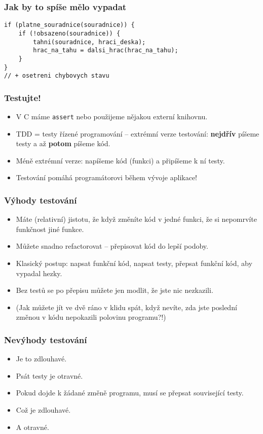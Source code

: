 \documentclass{beamer}
\newenvironment{itemizex}%
  {\large \begin{itemize}%
    \setlength{\itemsep}{8pt}%
    \setlength{\parskip}{8pt}}%
  {\end{itemize}}
\begin{document}
\begin{frame}[t,fragile]\frametitle{Jak by to spíše mělo vypadat} 
\begin{verbatim} 
if (platne_souradnice(souradnice)) {
    if (!obsazeno(souradnice)) {
        tahni(souradnice, hraci_deska);
        hrac_na_tahu = dalsi_hrac(hrac_na_tahu);
    } 
}
// + osetreni chybovych stavu
\end{verbatim}
\end{frame}


\begin{frame}[t,fragile]\frametitle{Testujte!} 
    \begin{itemizex}
        \item V C máme \texttt{assert} nebo použijeme nějakou externí knihovnu.
        \item TDD = testy řízené programování -- extrémní verze testování: \textbf{nejdřív} píšeme testy a až \textbf{potom} píšeme kód.
        \item Méně extrémní verze: napíšeme kód (funkci) a připíšeme k ní testy.
        \item Testování pomáhá programátorovi během vývoje aplikace! 
    \end{itemizex}
\end{frame}


\begin{frame}[t,fragile]\frametitle{Výhody testování} 
    \begin{itemizex}
        \item Máte (relativní) jistotu, že když změníte kód v jedné funkci, že si nepomrvíte funkčnost jiné funkce.
        \item Můžete snadno refactorovat -- přepisovat kód do lepší podoby. 
        \item Klasický postup: napsat funkční kód, napsat testy, přepsat funkční kód, aby vypadal hezky. 
        \item Bez testů se po přepisu můžete jen modlit, že jste nic nezkazili. 
        \item (Jak můžete jít ve dvě ráno v klidu spát, když nevíte, zda jste poslední změnou v kódu nepokazili polovinu programu?!)
    \end{itemizex}
\end{frame}


\begin{frame}[t,fragile]\frametitle{Nevýhody testování} 
    \begin{itemizex}
        \item Je to zdlouhavé. 
        \item Psát testy je otravné.
        \item Pokud dojde k žádané změně programu, musí se přepsat související testy.
        \item Což je zdlouhavé.
        \item A otravné.
    \end{itemizex}
\end{frame}
\end{document}
